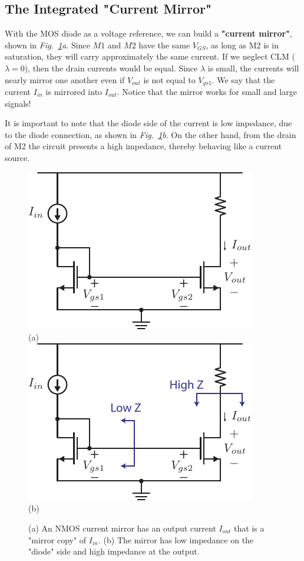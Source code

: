 \subsection{The Integrated "Current Mirror"}
With the MOS diode as a voltage reference, we can build a \textbf{"current mirror"}, shown in \emph{Fig.~\ref{fig:mirror_105}a}.  Since $M1$ and $M2$ have the same $V_{GS}$, as long as M2 is in saturation, they will carry approximately the same current.  If we neglect CLM ($\lambda = 0$), then the drain currents would be equal. Since $\lambda$ is small, the currents will nearly mirror one another even if $V_{out}$ is not equal to $V_{gs1}$. We say that the current $I_{in}$ is mirrored into $I_{out}$. Notice that the mirror works for small and large signals!

It is important to note that the diode side of the current is low impedance, due to the diode connection, as shown in \emph{Fig.~\ref{fig:mirror_105}b}.  On the other hand, from the drain of M2 the circuit presents a high impedance, thereby behaving like a current source.
\vspace{1cm}
\begin{figure}[H]
\centering
\includegraphics[scale=1.5]{5mirror_105.pdf}\\
(a)\\[1cm]
\includegraphics[scale=1.5]{5bmirror_105.pdf}\\
(b)
\caption{(a) An NMOS current mirror has an output current $I_{out}$ that is a "mirror copy" of $I_{in}$.  (b) The mirror has low impedance on the "diode" side and high impedance at the output.}
\label{fig:mirror_105}
\end{figure}
